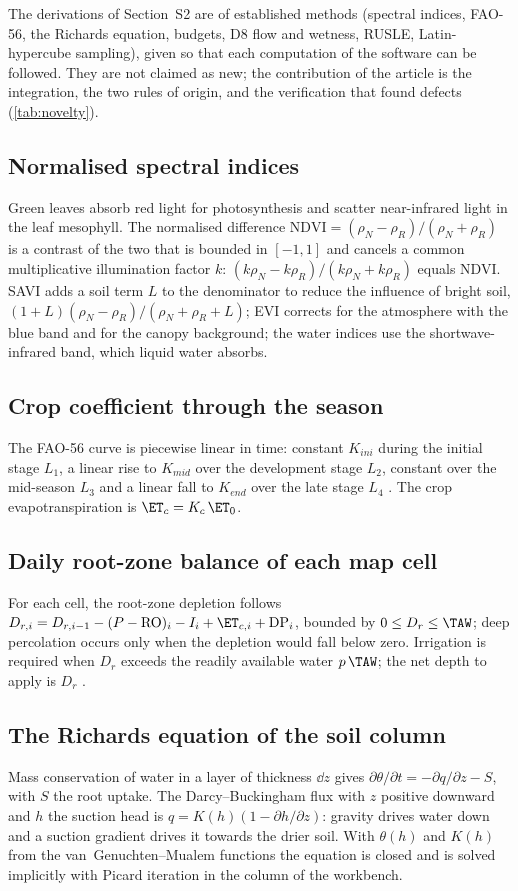 The derivations of Section~S2 are of established methods (spectral indices, FAO-56, the Richards equation, budgets, D8 flow and wetness, RUSLE, Latin-hypercube sampling), given so that each computation of the software can be followed. They are not claimed as new; the contribution of the article is the integration, the two rules of origin, and the verification that found defects (\cref{tab:novelty}).

\subsection{Normalised spectral indices}
Green leaves absorb red light for photosynthesis and scatter near-infrared light in the leaf mesophyll. The normalised difference $\mathrm{NDVI}=(\rho_N-\rho_R)/(\rho_N+\rho_R)$ is a contrast of the two that is bounded in $[-1,1]$ and cancels a common multiplicative illumination factor $k$: $(k\rho_N-k\rho_R)/(k\rho_N+k\rho_R)$ equals NDVI. SAVI adds a soil term $L$ to the denominator to reduce the influence of bright soil, $(1+L)(\rho_N-\rho_R)/(\rho_N+\rho_R+L)$; EVI corrects for the atmosphere with the blue band and for the canopy background; the water indices use the shortwave-infrared band, which liquid water absorbs.

\subsection{Crop coefficient through the season}
The FAO-56 curve is piecewise linear in time: constant $K_{ini}$ during the initial stage $L_1$, a linear rise to $K_{mid}$ over the development stage $L_2$, constant over the mid-season $L_3$ and a linear fall to $K_{end}$ over the late stage $L_4$ \citep{Allen1998}. The crop evapotranspiration is $\ET_c=K_c\,\ET_0$.

\subsection{Daily root-zone balance of each map cell}
For each cell, the root-zone depletion follows $D_{r,i}=D_{r,i-1}-(P-\mathrm{RO})_i-I_i+\ET_{c,i}+\mathrm{DP}_i$, bounded by $0\le D_{r}\le\TAW$; deep percolation occurs only when the depletion would fall below zero. Irrigation is required when $D_r$ exceeds the readily available water $p\,\TAW$; the net depth to apply is $D_r$ \citep{Allen1998}.

\subsection{The Richards equation of the soil column}
Mass conservation of water in a layer of thickness $\dd z$ gives $\partial\theta/\partial t=-\partial q/\partial z-S$, with $S$ the root uptake. The Darcy--Buckingham flux with $z$ positive downward and $h$ the suction head is $q=K(h)(1-\partial h/\partial z)$: gravity drives water down and a suction gradient drives it towards the drier soil. With $\theta(h)$ and $K(h)$ from the van~Genuchten--Mualem functions the equation is closed and is solved implicitly with Picard iteration in the column of the workbench.

